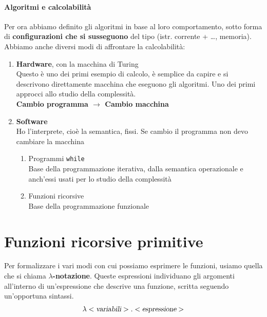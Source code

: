 \documentclass[10pt]{book}
\begin{document}
\paragraph{Algoritmi e calcolabilità} Per ora abbiamo definito gli algoritmi in base al loro comportamento, sotto forma di \textbf{configurazioni che si susseguono} del tipo (istr. corrente + \ldots, memoria). Abbiamo anche diversi modi di affrontare la calcolabilità:
\begin{enumerate}
	\item \textbf{Hardware}, con la macchina di Turing\\
	Questo è uno dei primi esempio di calcolo, è semplice da capire e si descrivono direttamente macchina che eseguono gli algoritmi. Uno dei primi approcci allo studio della complessità.\\
	\textbf{Cambio programma $\rightarrow$ Cambio macchina}
	\item \textbf{Software}\\
	Ho l'interprete, cioè la semantica, fissi. Se cambio il programma non devo cambiare la macchina
	\begin{enumerate}
		\item Programmi \texttt{while}\\
		Base della programmazione iterativa, dalla semantica operazionale e anch'essi usati per lo studio della complessità
		\item Funzioni ricorsive\\
		Base della programmazione funzionale
	\end{enumerate}
\end{enumerate}
\pagebreak
\section{Funzioni ricorsive primitive}
Per formalizzare i vari modi con cui possiamo esprimere le funzioni, usiamo quella che si chiama \textbf{$\lambda$-notazione}. Queste espressioni individuano gli argomenti all'interno di un'espressione che descrive una funzione, scritta seguendo un'opportuna sintassi.
$$\lambda <\textsl{variabili}>.<\textsl{espressione}>$$
\end{document}
